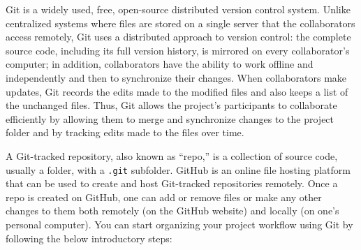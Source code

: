 \documentclass[12pt]{article}
\begin{document}
Git is a widely used, free, open-source distributed version control system. Unlike centralized systems where files are stored on a single server that the collaborators access remotely, Git uses a distributed approach to version control: the complete source code, including its full version history, is mirrored on every collaborator's computer; in addition, collaborators have the ability to work offline and independently and then to synchronize their changes. When collaborators make updates, Git records the edits made to the modified files and also keeps a list of the unchanged files. Thus, Git allows the project's participants to collaborate efficiently by allowing them to merge and synchronize changes to the project folder and by tracking edits made to the files over time.

A Git-tracked repository, also known as ``repo,'' is a collection of source code, usually a folder, with a \texttt{.git} subfolder. GitHub is an online file hosting platform that can be used to create and host Git-tracked repositories remotely. Once a repo is created on GitHub, one can add or remove files or make any other changes to them both remotely (on the GitHub website) and locally (on one’s personal computer). You can start organizing your project workflow using Git by following the below introductory steps:
\end{document}

